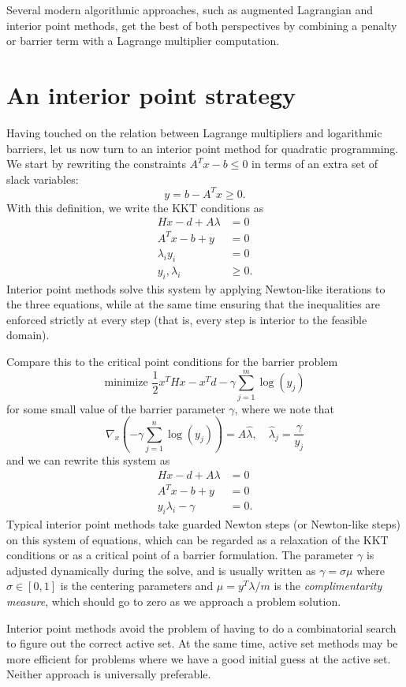 \documentclass[12pt, leqno]{article} %
\begin{document}
Several modern algorithmic approaches, such as augmented Lagrangian
and interior point methods, get the best of both perspectives by
combining a penalty or barrier term with a Lagrange multiplier
computation.

\section{An interior point strategy}

Having touched on the relation between Lagrange multipliers and
logarithmic barriers, let us now turn to an interior point
method for quadratic programming.  We start by rewriting the
constraints $A^Tx - b \leq 0$ in terms of an extra set of slack
variables:
\[
  y = b-A^Tx \geq 0.
\]
With this definition, we write the KKT conditions as
\begin{align*}
  Hx - d + A\lambda & = 0 \\
  A^T x-b+y &= 0 \\
  \lambda_i y_i &= 0 \\
  y_i, \lambda_i & \geq 0.
\end{align*}
Interior point methods solve this system by applying Newton-like
iterations to the three equations, while at the same time ensuring
that the inequalities are enforced strictly at every step (that is,
every step is interior to the feasible domain).

Compare this to the critical point conditions for the barrier problem
\[
  \mbox{minimize } \frac{1}{2} x^T H x - x^T d - \gamma \sum_{j=1}^m \log(y_j)
\]
for some small value of the barrier parameter $\gamma$, where we note that
\[
  \nabla_x \left( -\gamma \sum_{j=1}^n \log(y_j) \right) =
  A \hat{\lambda}, \quad \hat{\lambda}_j = \frac{\gamma}{y_j}  
\]
and we can rewrite this system as
\begin{align*}
  Hx - d + A\lambda &= 0 \\
  A^T x - b + y &= 0 \\
  y_i \lambda_i - \gamma &= 0.
\end{align*}
Typical interior point methods take guarded Newton steps (or
Newton-like steps) on this system of equations, which can be regarded
as a relaxation of the KKT conditions or as a critical point of a
barrier formulation.  The parameter $\gamma$ is adjusted dynamically
during the solve, and is usually written as $\gamma = \sigma \mu$
where $\sigma \in [0,1]$ is the centering parameters and
$\mu = y^T \lambda / m$ is the {\em complimentarity measure},
which should go to zero as we approach a problem solution.

Interior point methods avoid the problem of having to do a
combinatorial search to figure out the correct active set.  At the
same time, active set methods may be more efficient for problems
where we have a good initial guess at the active set.  Neither
approach is universally preferable.
\end{document}
